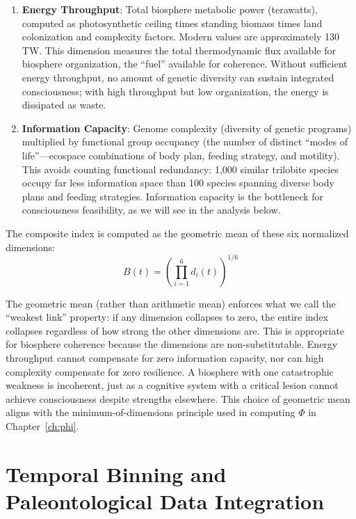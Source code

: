 \begin{enumerate}
\item \textbf{Energy Throughput}: Total biosphere metabolic power (terawatts), computed as photosynthetic ceiling times standing biomass times land colonization and complexity factors. Modern values are approximately 130 TW. This dimension measures the total thermodynamic flux available for biosphere organization, the ``fuel'' available for coherence. Without sufficient energy throughput, no amount of genetic diversity can sustain integrated consciousness; with high throughput but low organization, the energy is dissipated as waste.

\item \textbf{Information Capacity}: Genome complexity (diversity of genetic programs) multiplied by functional group occupancy (the number of distinct ``modes of life''---ecospace combinations of body plan, feeding strategy, and motility). This avoids counting functional redundancy: 1,000 similar trilobite species occupy far less information space than 100 species spanning diverse body plans and feeding strategies. Information capacity is the bottleneck for consciousness feasibility, as we will see in the analysis below.

\end{enumerate}

The composite index is computed as the geometric mean of these six normalized dimensions:
\begin{equation}
B(t) = \left(\prod_{i=1}^{6} d_i(t)\right)^{1/6}
\end{equation}

The geometric mean (rather than arithmetic mean) enforces what we call the ``weakest link'' property: if any dimension collapses to zero, the entire index collapses regardless of how strong the other dimensions are. This is appropriate for biosphere coherence because the dimensions are non-substitutable. Energy throughput cannot compensate for zero information capacity, nor can high complexity compensate for zero resilience. A biosphere with one catastrophic weakness is incoherent, just as a cognitive system with a critical lesion cannot achieve consciousness despite strengths elsewhere. This choice of geometric mean aligns with the minimum-of-dimensions principle used in computing $\Phi$ in Chapter~\ref{ch:phi}.

\section{Temporal Binning and Paleontological Data Integration}

